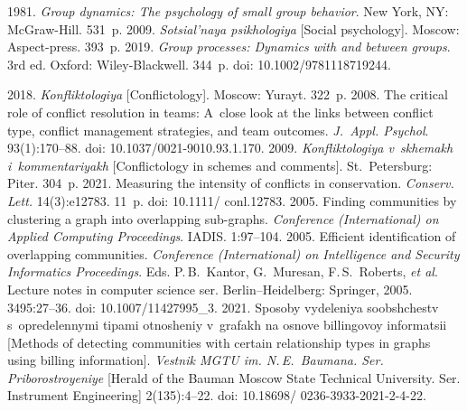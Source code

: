 \begin{multicols}{2}
{{\begin{thebibliography}{99}
    1981. \textit{Group dynamics: The psychology of small group behavior}. New 
York, NY: McGraw-Hill. 531~p.
    2009. \textit{Sotsial'naya psikhologiya} [Social psychology]. Moscow: 
Aspect-press. 393~p.
    2019. \textit{Group processes: Dynamics with and between 
groups}. 3rd ed. Oxford: Wiley-Blackwell. 344~p.  doi: 10.1002/9781118719244.

    2018. \textit{Konfliktologiya} [Conflictology]. Moscow: Yurayt. 
322~p. 
    2008. The critical role of conflict 
resolution in teams: A~close look at the links between conflict type, conflict management 
strategies, and team outcomes. \textit{J.~Appl. Psychol}. 93(1):170--88. doi:  
10.1037/0021-9010.93.1.170.
    2009. \textit{Konfliktologiya v~skhemakh 
i~kommentariyakh} [Conflictology in schemes and comments]. St.\ Petersburg: Piter. 304~p.
    2021. Measuring 
the intensity of conflicts in conservation. \textit{Conserv. Lett.} 14(3):e12783. 11~p. doi: 
10.1111/ conl.12783.
    2005. Finding 
communities by clustering a graph into overlapping sub-graphs. \textit{Conference (International) 
on Applied Computing Proceedings}. IADIS. 1:97--104. 
    2005. Efficient identification of 
overlapping communities. \textit{Conference (International) on Intelligence and Security 
Informatics Proceedings}. Eds. P.\,B.~Kantor, G.~Muresan, F.\,S.~Roberts, \textit{et al}. 
Lecture notes in computer science ser. Berlin--Heidelberg: Springer, 2005. 
3495:27--36. doi: 10.1007/11427995\_3. 
    2021. Sposoby vydeleniya 
soobshchestv s~opredelennymi tipami otnosheniy v~grafakh na osnove billingovoy informatsii 
[Methods of detecting communities with certain relationship types in graphs using billing 
information]. \textit{Vestnik MGTU im. N.\,E.~Baumana. Ser. Priborostroyeniye} [Herald of the
Bauman Moscow State Technical University. Ser. Instrument Engineering] 2(135):4--22. doi:  
10.18698/ 0236-3933-2021-2-4-22.
   \end{thebibliography}

 }
 }

\end{multicols}

